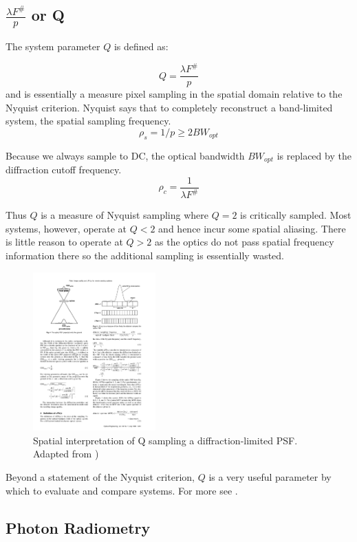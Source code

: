 \documentclass[10pt,journal]{IEEEtran}  %
\begin{document}
\subsection{$\frac{\lambda F^\#}{p}$ or Q}
\label{sec:q}

The system parameter $Q$ is defined as:

\begin{equation}
Q = \frac{\lambda F^\#}{p}
\label{eq:Q}
\end{equation}
and is essentially a measure pixel sampling in the spatial domain relative to the Nyquist criterion.  Nyquist says that to completely reconstruct a band-limited system, the spatial sampling frequency. 
$$\rho_s = 1/p \geq 2 BW_{opt}$$

Because we always sample to DC, the optical bandwidth $BW_{opt}$ is replaced by the diffraction cutoff frequency.
$$\rho_c = \frac{1}{\lambda F^\#}$$

Thus $Q$ is a measure of Nyquist sampling where $Q=2$ is critically sampled.  Most systems, however, operate at $Q < 2$ and hence incur some spatial aliasing.  There is little reason to operate at $Q > 2$ as the optics do not pass spatial frequency information there so the additional sampling is essentially wasted.

\begin{figure}[h!]
\includegraphics[width=0.42\textwidth]{figures/Q_fiete.pdf}
\caption{Spatial interpretation of Q sampling a diffraction-limited PSF.  Adapted from \cite{fiete_q})}
\end{figure} 

Beyond a statement of the Nyquist criterion, $Q$ is a very useful parameter by which to evaluate and compare systems.  For more see \cite{fiete_q}.  

\subsection{Photon Radiometry}
\end{document}
